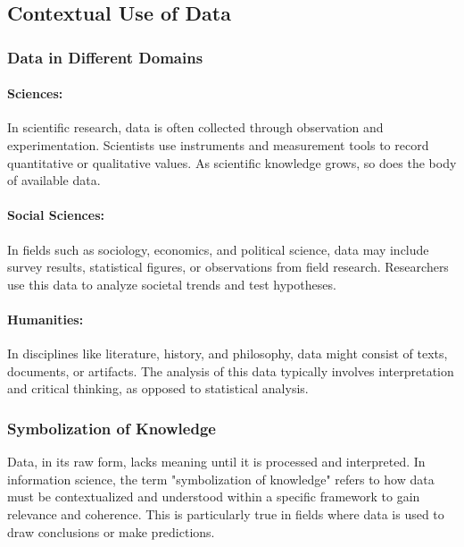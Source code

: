 \documentclass[12pt, oneside]{book}
\begin{document}
\subsection{Contextual Use of Data}
\subsubsection{Data in Different Domains}
\paragraph{Sciences:} In scientific research, data is often collected through observation and experimentation. Scientists use instruments and measurement tools to record quantitative or qualitative values. As scientific knowledge grows, so does the body of available data.\\
\paragraph{Social Sciences:} In fields such as sociology, economics, and political science, data may include survey results, statistical figures, or observations from field research. Researchers use this data to analyze societal trends and test hypotheses.\\
\paragraph{Humanities:} In disciplines like literature, history, and philosophy, data might consist of texts, documents, or artifacts. The analysis of this data typically involves interpretation and critical thinking, as opposed to statistical analysis.\\
\subsubsection{Symbolization of Knowledge}
Data, in its raw form, lacks meaning until it is processed and interpreted. In information science, the term "symbolization of knowledge" refers to how data must be contextualized and understood within a specific framework to gain relevance and coherence. This is particularly true in fields where data is used to draw conclusions or make predictions.\\
\end{document}
